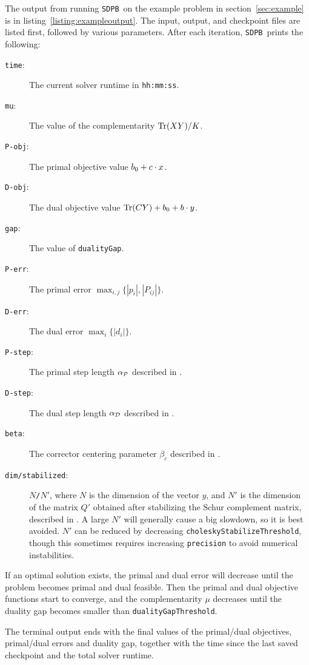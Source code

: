 \documentclass[12pt]{article}
\numberwithin{equation}{section}
\newcommand\SDPB{\texttt{SDPB}}
\begin{document}
The output from running \SDPB\ on the example problem in section~\ref{sec:example} is in listing~\ref{listing:exampleoutput}.  The input, output, and checkpoint files are listed first, followed by various parameters.  After each iteration, \SDPB\ prints the following:
\begin{description}
\item[\texttt{time}:] The current solver runtime in \texttt{hh:mm:ss}.
\item[\texttt{mu}:] The value of the complementarity $\Tr(XY)/K$.
\item[\texttt{P-obj}:] The primal objective value $b_0+c\.x$.
\item[\texttt{D-obj}:] The dual objective value $\Tr(CY)+b_0+b\.y$.
\item[\texttt{gap}:] The value of \texttt{dualityGap}.
\item[\texttt{P-err}:] The primal error $\max_{i,j}\{|p_i|,|P_{ij}|\}$.
\item[\texttt{D-err}:] The dual error $\max_i\{|d_i|\}$.
\item[\texttt{P-step}:] The primal step length $\alpha_\cP$ described in \cite{DSD}.
\item[\texttt{D-step}:] The dual step length $\alpha_\cD$ described in \cite{DSD}.
\item[\texttt{beta}:]  The corrector centering parameter $\beta_c$ described in \cite{DSD}.
\item[\texttt{dim/stabilized}:] $N$\texttt{/}$N'$, where $N$ is the dimension of the vector $y$, and $N'$ is the dimension of the matrix $Q'$ obtained after stabilizing the Schur complement matrix, described in \cite{DSD}.  A large $N'$ will generally cause a big slowdown, so it is best avoided.  $N'$ can be reduced by decreasing \texttt{choleskyStabilizeThreshold}, though this sometimes requires increasing \texttt{precision} to avoid numerical instabilities.
\end{description}

If an optimal solution exists, the primal and dual error will decrease until the problem becomes primal and dual feasible.  Then the primal and dual objective functions start to converge, and the complementarity $\mu$ decreases until the duality gap becomes smaller than \texttt{dualityGapThreshold}.

The terminal output ends with the final values of the primal/dual objectives, primal/dual errors and duality gap, together with the time since the last saved checkpoint and the total solver runtime.
\end{document}
